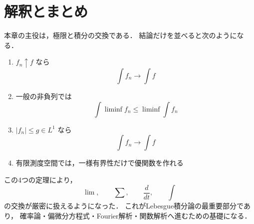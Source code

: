 \section{解釈とまとめ}

本章の主役は，極限と積分の交換である．
結論だけを並べると次のようになる．
\begin{enumerate}
    \item $f_n \uparrow f$ なら
    \[
    \int f_n \to \int f
    \]
    \item 一般の非負列では
    \[
    \int \liminf f_n \le \liminf \int f_n
    \]
    \item $|f_n|\le g \in L^1$ なら
    \[
    \int f_n \to \int f
    \]
    \item 有限測度空間では，一様有界性だけで優関数を作れる
\end{enumerate}

この4つの定理により，
\[
\lim,\qquad \sum,\qquad \frac{d}{dt},\qquad \int
\]
の交換が厳密に扱えるようになった．
これがLebesgue積分論の最重要部分であり，
確率論・偏微分方程式・Fourier解析・関数解析へ進むための基礎になる．
